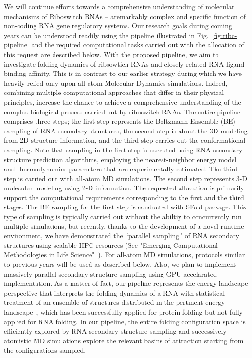 \documentclass[a4paper,10pt]{article}
\begin{document}
We will continue efforts towards a comprehensive understanding of molecular mechanisms of Riboswitch RNAs -- aremarkably complex and specific function of non-coding RNA gene regulatory systems.  Our research goals during coming years can be understood readily using the pipeline illustrated in Fig.~\ref{fig:ribo-pipeline} and the required computational tasks carried out with the allocation of this request are described below. With the proposed pipeline, we aim to investigate folding dynamics of ribsowtich RNAs and closely related RNA-ligand binding affinity.  This is in contrast to our earlier strategy during which we have heavily relied only upon all-atom Molecular Dynamics simulations.  Indeed, combining multiple computational approaches that differ in their physical principles, increase the chance to achieve a comprehensive understanding of the complex biological process carried out by riboswitch RNAs.  The entire pipeline comprises three steps; the first step represents the Boltzmann Ensemble (BE) sampling of RNA secondary structures, the second step is about the 3D modeling from 2D structure information, and the third step carries out the conformational sampling.  Note that sampling in the first step is executed using RNA secondary structure prediction algorithms, employing the nearest-neighbor energy model and thermodynamics parameters that are experimentally estimated.  The third step is carried out with all-atom MD simulations. The second step represents 3-D molecular modeling using 2-D information.  The requested allocation is primarily support the computational requirements corresponding to the first and the third stages. The BE sampling for the first step is conducted with SFold package\cite{ding2006}.  This type of sampling is typically carried out without the abiltiy to concurrently run multiple simulations, but recently, thanks to the development of a novel runtime environment, we have demonstrated the ``parallel sampling'' of RNA secondary structures using scalable HPC resources (See "Emerging Computational Methodologies in Life Science"~\cite{ecmls10}). For all-atom MD simulations, protocols similar to previous years will be used as described below.  Also, we plan to implement massively parallel secondary structure sampling using GPU-accelarated implementation.  As a matter of fact, our pipeline represents the energy landscape perspective that interprets the folding dynamics of a RNA with statistical treatment of an ensemble of structures distributed in the pertinent energy landscape~\cite{onuchic1997}, which has been successfully applied for protein folding but not fully applied for RNA folding\cite{cupal1997}. In our pipeline, the entire folding configuration space is efficiently explored by RNA secondary structure sampling and successively atomistic MD simulations explore the relevant basins of attraction starting from the configurations sampled.
\end{document}
